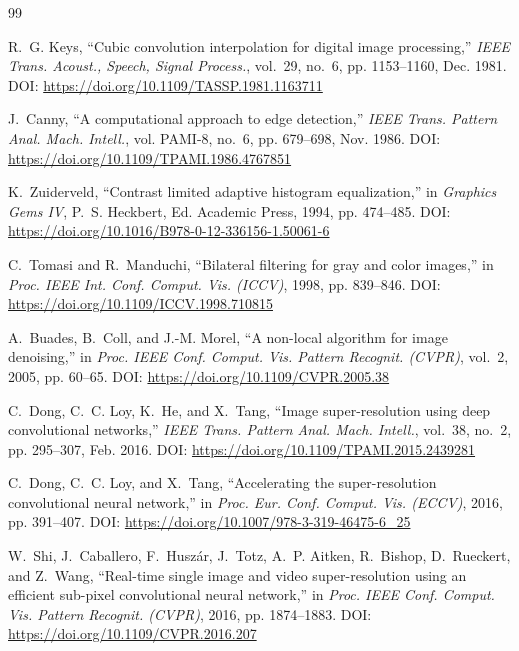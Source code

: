 \documentclass[10pt,onecolumn,journal]{IEEEtran}
\begin{document}
\clearpage
\begin{thebibliography}{99}

R.~G. Keys, ``Cubic convolution interpolation for digital image processing,'' \emph{IEEE Trans. Acoust., Speech, Signal Process.}, vol.~29, no.~6, pp. 1153--1160, Dec. 1981. DOI: \url{https://doi.org/10.1109/TASSP.1981.1163711}

J.~Canny, ``A computational approach to edge detection,'' \emph{IEEE Trans. Pattern Anal. Mach. Intell.}, vol. PAMI-8, no.~6, pp. 679--698, Nov. 1986. DOI: \url{https://doi.org/10.1109/TPAMI.1986.4767851}

K.~Zuiderveld, ``Contrast limited adaptive histogram equalization,'' in \emph{Graphics Gems IV}, P.~S. Heckbert, Ed. Academic Press, 1994, pp. 474--485. DOI: \url{https://doi.org/10.1016/B978-0-12-336156-1.50061-6}

C.~Tomasi and R.~Manduchi, ``Bilateral filtering for gray and color images,'' in \emph{Proc. IEEE Int. Conf. Comput. Vis. (ICCV)}, 1998, pp. 839--846. DOI: \url{https://doi.org/10.1109/ICCV.1998.710815}

A.~Buades, B.~Coll, and J.-M. Morel, ``A non-local algorithm for image denoising,'' in \emph{Proc. IEEE Conf. Comput. Vis. Pattern Recognit. (CVPR)}, vol.~2, 2005, pp. 60--65. DOI: \url{https://doi.org/10.1109/CVPR.2005.38}

C.~Dong, C.~C. Loy, K.~He, and X.~Tang, ``Image super-resolution using deep convolutional networks,'' \emph{IEEE Trans. Pattern Anal. Mach. Intell.}, vol.~38, no.~2, pp. 295--307, Feb. 2016. DOI: \url{https://doi.org/10.1109/TPAMI.2015.2439281}

C.~Dong, C.~C. Loy, and X.~Tang, ``Accelerating the super-resolution convolutional neural network,'' in \emph{Proc. Eur. Conf. Comput. Vis. (ECCV)}, 2016, pp. 391--407. DOI: \url{https://doi.org/10.1007/978-3-319-46475-6_25}

W.~Shi, J.~Caballero, F.~Husz{\'a}r, J.~Totz, A.~P. Aitken, R.~Bishop, D.~Rueckert, and Z.~Wang, ``Real-time single image and video super-resolution using an efficient sub-pixel convolutional neural network,'' in \emph{Proc. IEEE Conf. Comput. Vis. Pattern Recognit. (CVPR)}, 2016, pp. 1874--1883. DOI: \url{https://doi.org/10.1109/CVPR.2016.207}


\end{thebibliography}
\end{document}
